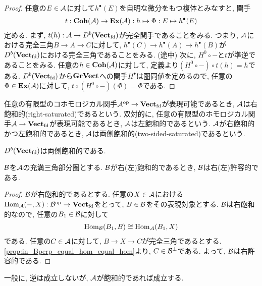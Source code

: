 \documentclass[uplatex, a4paper, 14Q, dvipdfmx]{jsarticle}
\begin{document}
\begin{proof}
  任意の$E \in \mathcal{A}$に対して$h^\bullet(E)$を自明な微分をもつ複体とみなすと, 関手
  \begin{align*}
    t : \mathbf{Coh}(\mathcal{A}) \to \mathbf{Ex}(\mathcal{A}) : h \mapsto \Phi : E \mapsto h^\bullet(E)
  \end{align*}
  定める. 
  まず, $t(h) : \mathcal{A} \to D^b(\mathbf{Vect}_{\mathrm{fd}})$が完全関手であることをみる. 
  つまり, $\mathcal{A}$における完全三角$B \to A \to C$に対して, $h^\bullet(C) \to h^\bullet(A) \to h^\bullet(B)$が$D^b(\mathbf{Vect}_{\mathrm{fd}})$における完全三角であることをみる. (途中)
  次に, $H^0 \circ -$と$t$が準逆であることをみる. 
  任意の$h \in \mathbf{Coh}(\mathcal{A})$に対して, 定義より$(H^0 \circ -) \circ t(h) = h$である. 
  $D^b(\mathbf{Vect}_{\mathrm{fd}})$から$\mathbf{GrVect}$への関手$H^\bullet$は圏同値を定めるので, 任意の$\Phi \in \mathbf{Ex}(\mathcal{A})$に対して, $t \circ (H^0 \circ -)(\Phi) = \Phi$である. 
\end{proof}

\begin{definition}[飽和的]
  任意の有限型のコホモロジカル関手$\mathcal{A}^{\mathrm{op}} \to \mathbf{Vect}_{\mathrm{fd}}$が表現可能であるとき, $\mathcal{A}$は右飽和的(right-saturated)であるという. 
  双対的に, 任意の有限型のホモロジカル関手$\mathcal{A} \to \mathbf{Vect}_{\mathrm{fd}}$が表現可能であるとき, $\mathcal{A}$は左飽和的であるという.
  $\mathcal{A}$が右飽和的かつ左飽和的であるとき, $\mathcal{A}$は両側飽和的(two-sided-saturated)であるという.
\end{definition}

\begin{example}
  $D^b(\mathbf{Vect}_{\mathrm{fd}})$は両側飽和的である. 
\end{example}

\begin{theorem} \label{prop:saturated_imply_admissible}
  $\mathcal{B}$を$\mathcal{A}$の充満三角部分圏とする. 
  $\mathcal{B}$が右(左)飽和的であるとき, $\mathcal{B}$は右(左)許容的である. 
\end{theorem}

\begin{proof}
  $\mathcal{B}$が右飽和的であるとする.
  任意の$X \in \mathcal{A}$における$\mathrm{Hom}_{\mathcal{A}}(-,X) : \mathcal{B}^{\mathrm{op}} \to \mathbf{Vect}_{\mathrm{fd}}$をとって, $B \in \mathcal{B}$をその表現対象とする. 
  $\mathcal{B}$は右飽和的なので, 任意の$B_1 \in \mathcal{B}$に対して
  \begin{align*}
    \mathrm{Hom}_{\mathcal{B}}(B_1,B) \cong \mathrm{Hom}_{\mathcal{A}}(B_1,X)
  \end{align*} 
  である. 
  任意の$C \in \mathcal{A}$に対して, $B \to X \to C$が完全三角であるとする.
  \cref{prop:in_Bperp_equal_hom_equal_hom}より, $C \in \mathcal{B}^\perp$である. 
  よって, $\mathcal{B}$は右許容的である. 
\end{proof}

一般に, 逆は成立しないが, $\mathcal{A}$が飽和的であれば成立する. 
\end{document}
